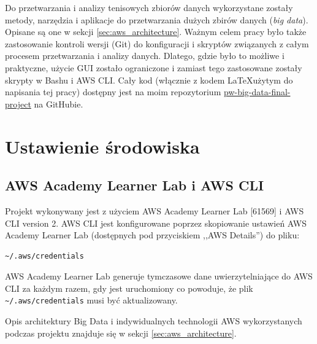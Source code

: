 \documentclass[12pt, a4paper]{article}
\begin{document}
Do przetwarzania i analizy tenisowych zbiorów danych wykorzystane zostały metody, narzędzia i aplikacje do przetwarzania dużych zbirów danych (\textit{big data}). Opisane są one w sekcji \ref{sec:aws_architecture}. Ważnym celem pracy było także zastosowanie kontroli wersji (Git) do konfiguracji i skryptów związanych z całym procesem przetwarzania i analizy danych. Dlatego, gdzie było to możliwe i praktyczne, użycie GUI zostało ograniczone i zamiast tego zastosowane zostały skrypty w Bashu i AWS CLI. Cały kod (włącznie z kodem \LaTeX użytym do napisania tej pracy) dostępny jest na moim repozytorium \href{https://github.com/safurynp/pw-big-data-final-project}{pw-big-data-final-project} na GitHubie.





\section{Ustawienie środowiska}
\subsection{AWS Academy Learner Lab i AWS CLI}
Projekt wykonywany jest z użyciem AWS Academy Learner Lab [61569] i AWS CLI version 2. AWS CLI jest konfigurowane poprzez skopiowanie ustawień AWS Academy Learner Lab (dostępnych pod przyciskiem ,,AWS Details'') do pliku:
\begin{verbatim}
~/.aws/credentials
\end{verbatim}
AWS Academy Learner Lab generuje tymczasowe dane uwierzytelniające do AWS CLI za każdym razem, gdy jest uruchomiony co powoduje, że plik \verb|~/.aws/credentials| musi być aktualizowany.



Opis architektury Big Data i indywidualnych technologii AWS wykorzystanych podczas projektu znajduje się w sekcji \ref{sec:aws_architecture}.
\end{document}
